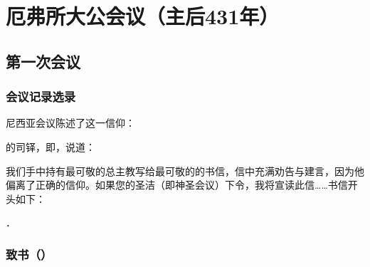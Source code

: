 
\chapter{厄弗所大公会议（主后431年）}



\section{第一次会议}


\subsection{会议记录选录}

\par

尼西亚会议陈述了这一信仰：\par

\par

的司铎，即，说道：\par

我们手中持有最可敬的总主教写给最可敬的的书信，信中充满劝告与建言，因为他偏离了正确的信仰。如果您的圣洁（即神圣会议）下令，我将宣读此信……书信开头如下：\par

．\par


\subsection{致书（）}

